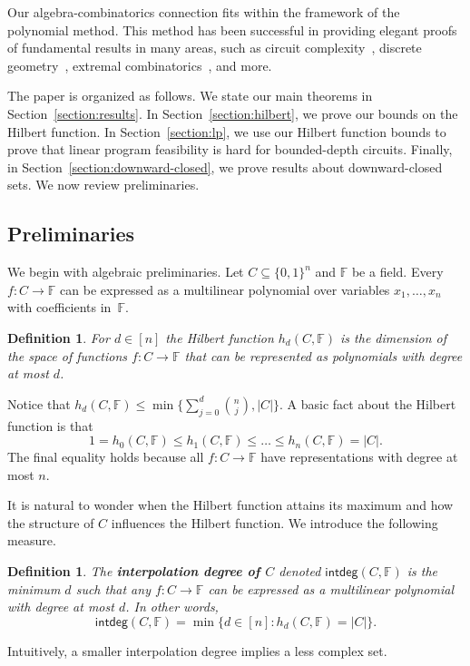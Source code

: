 \documentclass[11pt]{article}
\newtheorem{definition}[theorem]{Definition}
\theoremstyle{definition}
\newcommand{\1}{\mathbf{1}}
\newcommand{\F}{{\mathbb F}}
\renewcommand{\leq}{\leqslant}
\renewcommand{\int}{\mathsf{intdeg}}
\begin{document}
Our algebra-combinatorics connection fits within the framework of the polynomial method. This method has been successful in providing elegant proofs of fundamental results in many areas, such as circuit complexity~\cite{smolensky87, abfr, razborov, beigel}, discrete geometry~\cite{guthkatz, dvir, sharir, tao}, extremal combinatorics~\cite{alon-null, jukna-extremal, babai-frankl}, and more.   

The paper is organized as follows.  We state our main theorems in Section~\ref{section:results}.  In Section~\ref{section:hilbert}, we prove our bounds on the Hilbert function.   In Section~\ref{section:lp}, we use our Hilbert function bounds to prove that linear program feasibility is hard for bounded-depth circuits.  Finally, in Section~\ref{section:downward-closed}, we prove results about downward-closed sets.   We now review preliminaries.


\subsection{Preliminaries}  
We begin with algebraic preliminaries.   Let $C \subseteq \{0,1\}^n$ and $\F$ be a field.
Every $f : C \to \F$ can be expressed as a multilinear polynomial over variables $x_1,\ldots,x_n$ with coefficients in~$\F$.   
\begin{definition} For $d \in [n]$ the {\em Hilbert function} $h_d(C,\F)$ is the dimension of the space of functions $f: C \to \F$ that can be represented as polynomials with degree at most $d$. 
\end{definition}
\noindent
Notice that $h_d(C,\F) \leq \min\{\sum_{j=0}^d {n \choose j}, |C|\}$.  
A basic fact about the Hilbert function is that 
\[ 1 = h_0(C,\F) \leq h_1(C,\F) \leq \ldots \leq h_n(C,\F) =  |C|.\]
The final equality holds because all $f:C\to \F$ have representations with degree at most $n$.  

It is natural to wonder when the Hilbert function attains its maximum and how the structure of $C$ influences the Hilbert function. We introduce the following measure. 
\begin{definition}
The {\bf interpolation degree of $C$} denoted $\int(C,\F)$ is the minimum $d$ such that any $f:C \to \F$ can be expressed as a multilinear polynomial with degree at most $d$.  In other words, 
\[ \int(C,\F) = \min \{ d \in [n]  :  h_d(C,\F) = |C|\}. \]
\end{definition}
\noindent
Intuitively, a smaller interpolation degree implies a less complex set. 
\end{document}
